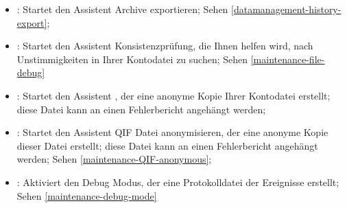 \begin{itemize}
	\item {}: Startet den Assistent Archive exportieren; Sehen \vref{datamanagement-history-export};%
	\item {}: Startet den Assistent Konsistenzprüfung, die Ihnen helfen wird, nach Unstimmigkeiten in Ihrer Kontodatei zu suchen; Sehen \vref{maintenance-file-debug}%
	\item {}: Startet den Assistent , der eine anonyme Kopie Ihrer Kontodatei erstellt; diese Datei kann an einen Fehlerbericht angehängt werden;%
	\item {}: Startet den Assistent QIF Datei anonymisieren, der eine anonyme Kopie dieser Datei erstellt; diese Datei kann an einen Fehlerbericht angehängt werden; Sehen \vref{maintenance-QIF-anonymous};%
	\item {}: Aktiviert den Debug Modus, der eine Protokolldatei der Ereignisse erstellt; Sehen \vref{maintenance-debug-mode} %

\end{itemize}
